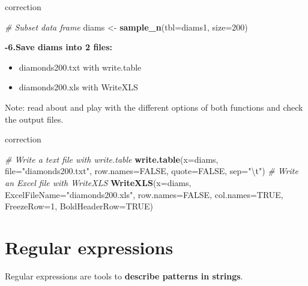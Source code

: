 \documentclass[]{book}
\newenvironment{Shaded}{\begin{snugshade}}{\end{snugshade}}
\newcommand{\CharTok}[1]{\textcolor[rgb]{0.31,0.60,0.02}{#1}}
\newcommand{\CommentTok}[1]{\textcolor[rgb]{0.56,0.35,0.01}{\textit{#1}}}
\newcommand{\DataTypeTok}[1]{\textcolor[rgb]{0.13,0.29,0.53}{#1}}
\newcommand{\DecValTok}[1]{\textcolor[rgb]{0.00,0.00,0.81}{#1}}
\newcommand{\KeywordTok}[1]{\textcolor[rgb]{0.13,0.29,0.53}{\textbf{#1}}}
\newcommand{\NormalTok}[1]{#1}
\newcommand{\OtherTok}[1]{\textcolor[rgb]{0.56,0.35,0.01}{#1}}
\newcommand{\StringTok}[1]{\textcolor[rgb]{0.31,0.60,0.02}{#1}}
\providecommand{\tightlist}{%
  \setlength{\itemsep}{0pt}\setlength{\parskip}{0pt}}
\begin{document}
correction

\begin{Shaded}
\begin{Highlighting}[]
\CommentTok{# Subset data frame}
\NormalTok{diams <-}\StringTok{ }\KeywordTok{sample_n}\NormalTok{(}\DataTypeTok{tbl=}\NormalTok{diams1, }\DataTypeTok{size=}\DecValTok{200}\NormalTok{)}
\end{Highlighting}
\end{Shaded}

\textbf{-6.Save diams into 2 files:}

\begin{itemize}
\tightlist
\item
  diamonds200.txt with write.table
\item
  diamonds200.xls with WriteXLS
\end{itemize}

Note: read about and play with the different options of both functions and check the output files.

correction

\begin{Shaded}
\begin{Highlighting}[]
\CommentTok{# Write a text file with write.table}
\KeywordTok{write.table}\NormalTok{(}\DataTypeTok{x=}\NormalTok{diams, }
    \DataTypeTok{file=}\StringTok{"diamonds200.txt"}\NormalTok{,}
        \DataTypeTok{row.names=}\OtherTok{FALSE}\NormalTok{,}
        \DataTypeTok{quote=}\OtherTok{FALSE}\NormalTok{,}
        \DataTypeTok{sep=}\StringTok{"}\CharTok{\textbackslash{}t}\StringTok{"}\NormalTok{)}
\CommentTok{# Write an Excel file with WriteXLS}
\KeywordTok{WriteXLS}\NormalTok{(}\DataTypeTok{x=}\NormalTok{diams, }
    \DataTypeTok{ExcelFileName=}\StringTok{"diamonds200.xls"}\NormalTok{, }
    \DataTypeTok{row.names=}\OtherTok{FALSE}\NormalTok{, }
    \DataTypeTok{col.names=}\OtherTok{TRUE}\NormalTok{, }
    \DataTypeTok{FreezeRow=}\DecValTok{1}\NormalTok{, }
    \DataTypeTok{BoldHeaderRow=}\OtherTok{TRUE}\NormalTok{)}
\end{Highlighting}
\end{Shaded}

\hypertarget{regular-expressions}{%
\chapter{Regular expressions}\label{regular-expressions}}

Regular expressions are tools to \textbf{describe patterns in strings}.
\end{document}
